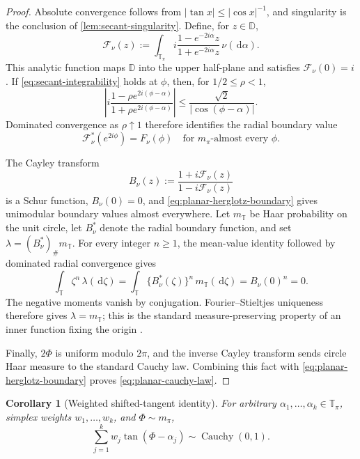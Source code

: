 \documentclass[11pt]{article}
\numberwithin{equation}{section}
\theoremstyle{thmstyleone}%
\newtheorem{corollary}[corollary]{Corollary}
\theoremstyle{thmstyletwo}%
\let\cref\autoref
\newcommand{\D}{\mathbb D}
\newcommand{\dd}{\,\mathrm d}
\newcommand{\Cauchy}{\operatorname{Cauchy}}
\begin{document}
\begin{proof}
Absolute convergence follows from
\(|\tan x|\leq|\cos x|^{-1}\), and singularity is the conclusion of
\cref{lem:secant-singularity}.  Define, for \(z\in\D\),
\begin{equation}
  \mathcal F_\nu(z)
  :=
  \int_{\mathbb T_\pi}
  i\frac{1-e^{-2i\alpha}z}{1+e^{-2i\alpha}z}
  \,\nu(\dd\alpha).
  \label{eq:planar-herglotz-integral}
\end{equation}
This analytic function maps \(\D\) into the upper half-plane and satisfies
\(\mathcal F_\nu(0)=i\).  If \cref{eq:secant-integrability} holds at
\(\phi\), then, for \(1/2\leq\rho<1\),
\[
  \left|
    i\frac{1-\rho e^{2i(\phi-\alpha)}}
            {1+\rho e^{2i(\phi-\alpha)}}
  \right|
  \leq
  \frac{\sqrt2}{|\cos(\phi-\alpha)|}.
\]
Dominated convergence as \(\rho\uparrow1\) therefore identifies the radial
boundary value
\begin{equation}
  \mathcal F_\nu^*(e^{2i\phi})=F_\nu(\phi)
  \quad\text{for \(m_\pi\)-almost every \(\phi\).}
  \label{eq:planar-herglotz-boundary}
\end{equation}

The Cayley transform
\begin{equation}
  B_\nu(z)
  :=
  \frac{1+i\mathcal F_\nu(z)}
       {1-i\mathcal F_\nu(z)}
  \label{eq:planar-cayley-map}
\end{equation}
is a Schur function, \(B_\nu(0)=0\), and
\cref{eq:planar-herglotz-boundary} gives unimodular boundary values almost
everywhere.  Let \(m_{\mathbb T}\) be Haar probability on the unit circle,
let \(B_\nu^*\) denote the radial boundary function, and set
\(\lambda=(B_\nu^*)_\#m_{\mathbb T}\).  For every integer \(n\geq1\),
the mean-value identity followed by dominated radial convergence gives
\[
  \int_{\mathbb T}\zeta^n\,\lambda(\dd\zeta)
  =
  \int_{\mathbb T}\{B_\nu^*(\zeta)\}^n
       \,m_{\mathbb T}(\dd\zeta)
  =B_\nu(0)^n=0.
\]
The negative moments vanish by conjugation.  Fourier--Stieltjes uniqueness
therefore gives \(\lambda=m_{\mathbb T}\); this is the standard
measure-preserving property of an inner function fixing the origin
\cite{nordgren-1968}.

Finally, \(2\Phi\) is uniform modulo \(2\pi\), and the inverse Cayley
transform sends circle Haar measure to the standard Cauchy law.  Combining
this fact with \cref{eq:planar-herglotz-boundary} proves
\cref{eq:planar-cauchy-law}.
\end{proof}

\begin{corollary}[Weighted shifted-tangent identity]
\label{cor:weighted-tangent}
For arbitrary \(\alpha_1,\ldots,\alpha_k\in\mathbb T_\pi\), simplex
weights \(w_1,\ldots,w_k\), and \(\Phi\sim m_\pi\),
\begin{equation}
  \sum_{j=1}^k w_j\tan(\Phi-\alpha_j)
  \sim\Cauchy(0,1).
  \label{eq:weighted-tangent-preview}
\end{equation}
\end{corollary}
\end{document}
